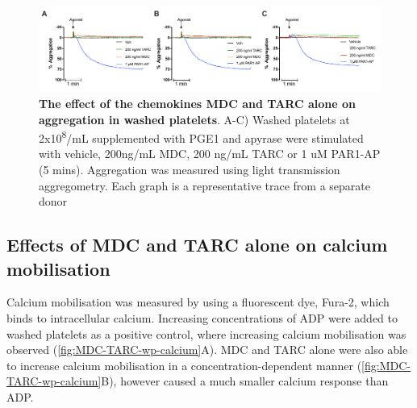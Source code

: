 \documentclass[11pt,twoside]{bristolthesis}
\begin{document}
\begin{figure}

{\centering \includegraphics[width=0.9\linewidth]{figure/Chemokines/Layouts/MDC_TARC_alone_wp_aggregation} 

}

\caption[The effect of the chemokines MDC and TARC alone on aggregation in washed platelets]{\textbf{The effect of the chemokines MDC and TARC alone on aggregation in washed platelets}. A-C) Washed platelets at 2x10\textsuperscript{8}/mL supplemented with PGE1 and apyrase were stimulated with vehicle, 200ng/mL MDC, 200 ng/mL TARC or 1 uM PAR1-AP (5 mins). Aggregation was measured using light transmission aggregometry. Each graph is a representative trace from a separate donor}\label{fig:MDC-TARC-wp-alone-aggregation}
\end{figure}
\hypertarget{effects-of-mdc-and-tarc-alone-on-calcium-mobilisation}{%
\subsection{Effects of MDC and TARC alone on calcium mobilisation}\label{effects-of-mdc-and-tarc-alone-on-calcium-mobilisation}}

Calcium mobilisation was measured by using a fluorescent dye, Fura-2, which binds to intracellular calcium. Increasing concentrations of ADP were added to washed platelets as a positive control, where increasing calcium mobilisation was observed (\ref{fig:MDC-TARC-wp-calcium}A). MDC and TARC alone were also able to increase calcium mobilisation in a concentration-dependent manner (\ref{fig:MDC-TARC-wp-calcium}B), however caused a much smaller calcium response than ADP.
\end{document}
